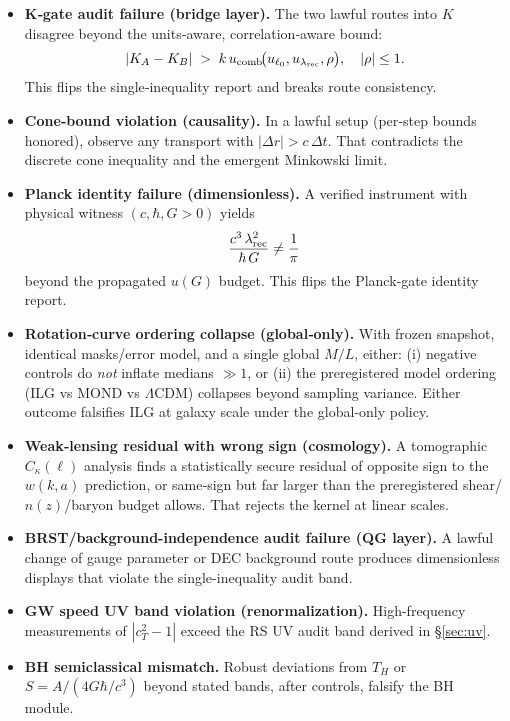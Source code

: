 \documentclass[11pt]{article}
\begin{document}
\begin{itemize}
  \item \textbf{K‑gate audit failure (bridge layer).} The two lawful routes into $K$ disagree beyond the units‑aware, correlation‑aware bound:
  \[
  |K_A-K_B| \;>\; k\,u_{\rm comb}\!\big(u_{\ell_0},u_{\lambda_{\rm rec}},\rho\big), \quad |\rho|\le 1.
  \]
  This flips the single‑inequality report and breaks route consistency.

  \item \textbf{Cone‑bound violation (causality).} In a lawful setup (per‑step bounds honored), observe any transport with $|\Delta r|>c\,\Delta t$. That contradicts the discrete cone inequality and the emergent Minkowski limit.

  \item \textbf{Planck identity failure (dimensionless).} A verified instrument with physical witness $(c,\hbar,G>0)$ yields
  \[
  \frac{c^3\,\lambda_{\rm rec}^2}{\hbar\,G} \ne \frac{1}{\pi}
  \]
  beyond the propagated $u(G)$ budget. This flips the Planck‑gate identity report.

  \item \textbf{Rotation‑curve ordering collapse (global‑only).} With frozen snapshot, identical masks/error model, and a single global $M/L$, either:
  (i) negative controls do \emph{not} inflate medians $\gg 1$, or
  (ii) the preregistered model ordering (ILG vs MOND vs $\Lambda$CDM) collapses beyond sampling variance.
  Either outcome falsifies ILG at galaxy scale under the global‑only policy.

  \item \textbf{Weak‑lensing residual with wrong sign (cosmology).} A tomographic $C_\kappa(\ell)$ analysis finds a statistically secure residual of opposite sign to the $w(k,a)$ prediction, or same‑sign but far larger than the preregistered shear/$n(z)$/baryon budget allows. That rejects the kernel at linear scales.

  \item \textbf{BRST/background-independence audit failure (QG layer).} A lawful change of gauge parameter or DEC background route produces dimensionless displays that violate the single-inequality audit band.

  \item \textbf{GW speed UV band violation (renormalization).} High-frequency measurements of $|c_T^2-1|$ exceed the RS UV audit band derived in \S\ref{sec:uv}.

  \item \textbf{BH semiclassical mismatch.} Robust deviations from $T_H$ or $S=A/(4G\hbar/c^3)$ beyond stated bands, after controls, falsify the BH module.


\end{itemize}
\end{document}
